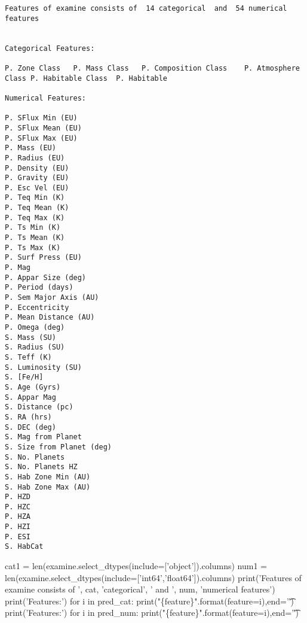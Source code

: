 \documentclass[11pt]{article}
\begin{document}
    \begin{Verbatim}[commandchars=\\\{\}]
Features of examine consists of  14 categorical  and  54 numerical features


Categorical Features:
 
P. Zone Class	P. Mass Class	P. Composition Class	P. Atmosphere Class	P. Habitable Class	P. Habitable	

Numerical Features:
 
P. SFlux Min (EU)
P. SFlux Mean (EU)
P. SFlux Max (EU)
P. Mass (EU)
P. Radius (EU)
P. Density (EU)
P. Gravity (EU)
P. Esc Vel (EU)
P. Teq Min (K)
P. Teq Mean (K)
P. Teq Max (K)
P. Ts Min (K)
P. Ts Mean (K)
P. Ts Max (K)
P. Surf Press (EU)
P. Mag
P. Appar Size (deg)
P. Period (days)
P. Sem Major Axis (AU)
P. Eccentricity
P. Mean Distance (AU)
P. Omega (deg)
S. Mass (SU)
S. Radius (SU)
S. Teff (K)
S. Luminosity (SU)
S. [Fe/H]
S. Age (Gyrs)
S. Appar Mag
S. Distance (pc)
S. RA (hrs)
S. DEC (deg)
S. Mag from Planet
S. Size from Planet (deg)
S. No. Planets
S. No. Planets HZ
S. Hab Zone Min (AU)
S. Hab Zone Max (AU)
P. HZD
P. HZC
P. HZA
P. HZI
P. ESI
S. HabCat

    \end{Verbatim}

    cat1 = len(examine.select\_dtypes(include={[}'object'{]}).columns) num1
= len(examine.select\_dtypes(include={[}'int64','float64'{]}).columns)
print('Features of examine consists of ', cat, 'categorical', ' and ',
num, 'numerical features') print('\n\nCategorical Features:\n ') for i
in pred\_cat: print("\{feature\}".format(feature=i),end='\t')
print('\n\nNumerical Features:\n ') for i in pred\_num:
print("\{feature\}".format(feature=i),end='\t')
\end{document}
